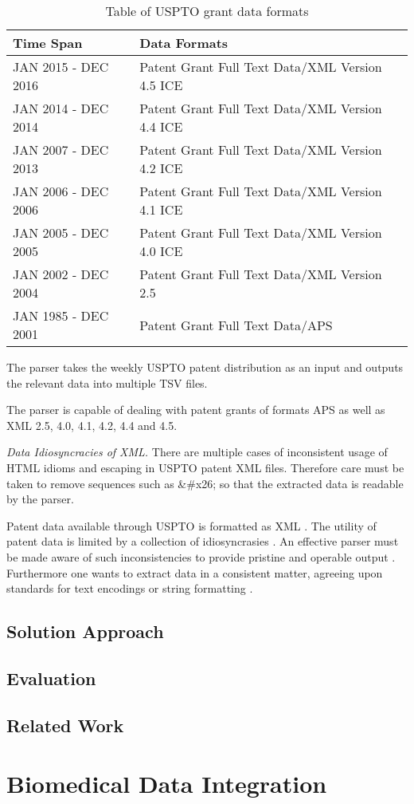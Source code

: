\begin{table}[h]
\begin{center}
\begin{footnotesize}
\begin{tabular*}{\textwidth}{|l|l|}
\hline
Time Span & Data Formats \\ \hline
JAN 2015 - DEC 2016 & Patent Grant Full Text Data/XML Version 4.5 ICE \\
JAN 2014 - DEC 2014 & Patent Grant Full Text Data/XML Version 4.4 ICE \\
JAN 2007 - DEC 2013 & Patent Grant Full Text Data/XML Version 4.2 ICE \\
JAN 2006 - DEC 2006 & Patent Grant Full Text Data/XML Version 4.1 ICE \\
JAN 2005 - DEC 2005 & Patent Grant Full Text Data/XML Version 4.0 ICE \\
JAN 2002 - DEC 2004 & Patent Grant Full Text Data/XML Version 2.5 \\
JAN 1985 - DEC 2001 & Patent Grant Full Text Data/APS \\ \hline
\end{tabular*}
\end{footnotesize}
\caption[Table of USPTO grant data formats]{Table of USPTO grant data formats \cite{fierro2014processing}}
\label{tab:uspto-grant-data-formats}
\end{center}
\end{table}

The parser takes the weekly USPTO patent distribution as an input and outputs the relevant data into multiple TSV files.

The parser is capable of dealing with patent grants of formats APS as well as XML 2.5, 4.0, 4.1, 4.2, 4.4 and 4.5.

\textit{Data Idiosyncracies of XML.} There are multiple cases of inconsistent usage of HTML idioms and escaping in USPTO patent XML files. Therefore care must be taken to remove sequences such as &#x26; so that the extracted data is readable by the parser.


Patent data available through USPTO is formatted as XML \cite{fierro2013extracting}.
The utility of patent data is limited by a collection of idiosyncrasies \cite{fierro2013extracting}.
An effective parser must be made aware of such inconsistencies to provide pristine and operable output \cite{fierro2013extracting}.
Furthermore one wants to extract data in a consistent matter, agreeing upon standards for text encodings or string formatting \cite{fierro2013extracting}.

\section{Solution Approach}
\section{Evaluation}
\section{Related Work}

\chapter{Biomedical Data Integration}
\label{cha:dataintegration}